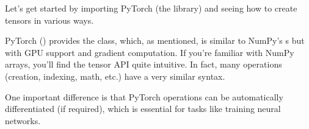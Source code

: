 \documentclass[letterpaper,10pt,english]{jupyterBook}
\begin{document}
\sphinxAtStartPar
Let’s get started by importing PyTorch (the  library) and seeing how to create tensors in various ways.

\sphinxAtStartPar
PyTorch () provides the  class, which, as mentioned, is similar to NumPy’s s but with GPU support and gradient computation. If you’re familiar with NumPy arrays, you’ll find the tensor API quite intuitive. In fact, many operations (creation, indexing, math, etc.) have a very similar syntax.

\sphinxAtStartPar
One important difference is that PyTorch operations can be automatically differentiated (if required), which is essential for tasks like training neural networks.
\end{document}
